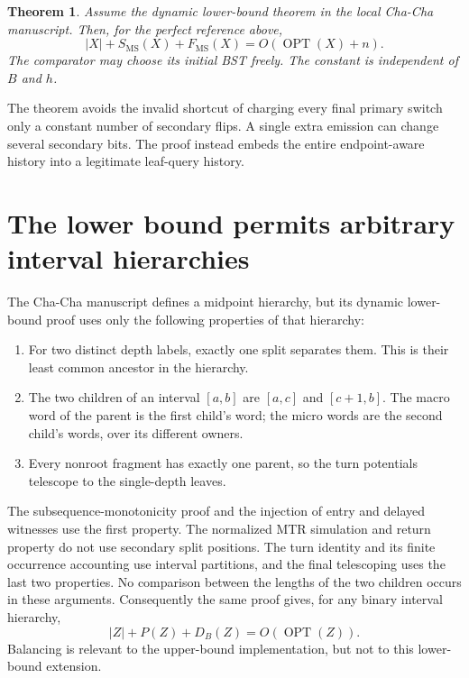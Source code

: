 \documentclass[11pt]{article}
\newtheorem{theorem}{Theorem}
\newcommand{\OPT}{\operatorname{OPT}}
\newcommand{\MS}{\mathrm{MS}}
\begin{document}
\begin{theorem}\label{thm:endpoint}
Assume the dynamic lower-bound theorem in the local Cha-Cha
manuscript. Then, for the perfect reference above,
\[
 |X|+S_{\MS}(X)+F_{\MS}(X)=O(\OPT(X)+n).
\]
The comparator may choose its initial BST freely. The constant is
independent of $B$ and $h$.
\end{theorem}

The theorem avoids the invalid shortcut of charging every final primary
switch only a constant number of secondary flips. A single extra
emission can change several secondary bits. The proof instead embeds
the entire endpoint-aware history into a legitimate leaf-query history.

\section{The lower bound permits arbitrary interval hierarchies}

The Cha-Cha manuscript defines a midpoint hierarchy, but its
dynamic lower-bound proof uses only the following properties of that
hierarchy:
\begin{enumerate}
\item For two distinct depth labels, exactly one split separates them.
This is their least common ancestor in the hierarchy.
\item The two children of an interval $[a,b]$ are $[a,c]$ and
$[c+1,b]$. The macro word of the parent is the first child's word;
the micro words are the second child's words, over its different owners.
\item Every nonroot fragment has exactly one parent, so the turn
potentials telescope to the single-depth leaves.
\end{enumerate}
The subsequence-monotonicity proof and the injection of entry and delayed
witnesses use the first property. The normalized MTR simulation and
return property do not use secondary split positions. The turn identity
and its finite occurrence accounting use interval partitions, and the
final telescoping uses the last two properties. No comparison between
the lengths of the two children occurs in these arguments.
Consequently the same proof gives, for any binary interval hierarchy,
\begin{equation}\label{eq:lower}
 |Z|+P(Z)+D_B(Z)=O(\OPT(Z)).
\end{equation}
Balancing is relevant to the upper-bound implementation, but not to this
lower-bound extension.
\end{document}
